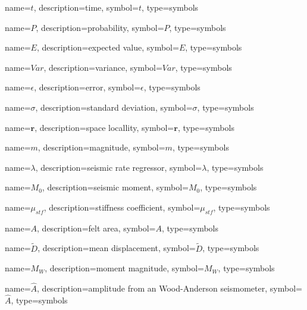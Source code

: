 
{
	name={\ensuremath{t}},
	description={time},
	symbol={\ensuremath{t}},
	type=symbols
}

{
	name={\ensuremath{P}},
	description={probability},
	symbol={\ensuremath{P}},
	type=symbols
}

{
	name={\ensuremath{E}},
	description={expected value},
	symbol={\ensuremath{E}},
	type=symbols
}

{
	name={\ensuremath{Var}},
	description={variance},
	symbol={\ensuremath{Var}},
	type=symbols
}

{
	name={\ensuremath{\epsilon}},
	description={error},
	symbol={\ensuremath{\epsilon}},
	type=symbols
}

{
	name={\ensuremath{\sigma}},
	description={standard deviation},
	symbol={\ensuremath{\sigma}},
	type=symbols
}


{
	name={\ensuremath{\boldsymbol{r}}},
	description={space locallity},
	symbol={\ensuremath{\boldsymbol{r}}},
	type=symbols
}


{
	name={\ensuremath{m}},
	description={magnitude},
	symbol={\ensuremath{m}},
	type=symbols
}


{
	name={\ensuremath{\lambda}},
	description={seismic rate regressor},
	symbol={\ensuremath{\lambda}},
	type=symbols
}

{
	name={\ensuremath{M_0}},
	description={seismic moment},
	symbol={\ensuremath{M_0}},
	type=symbols
}


{
	name={\ensuremath{\mu_{stf}}},
	description={stiffness coefficient},
	symbol={\ensuremath{\mu_{stf}}},
	type=symbols
}


{
	name={\ensuremath{A}},
	description={felt area},
	symbol={\ensuremath{A}},
	type=symbols
}


{
	name={\ensuremath{\tilde{D}}},
	description={mean displacement},
	symbol={\ensuremath{\tilde{D}}},
	type=symbols
}


{
	name={\ensuremath{M_W}},
	description={moment magnitude},
	symbol={\ensuremath{M_W}},
	type=symbols
}

{
	name={\ensuremath{\hat{A}}},
	description={amplitude from an Wood-Anderson seismometer},
	symbol={\ensuremath{\hat{A}}},
	type=symbols
}


